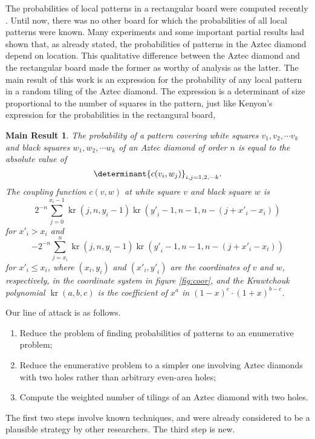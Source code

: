 \documentclass[10pt,reqno]{amsart}
\theoremstyle{plain}
\newtheorem{Mres}{Main Result}
\theoremstyle{definition}
\theoremstyle{remark}
\DeclareMathOperator{\kr }{kr}
\begin{document}
The probabilities of local patterns in a rectangular board were computed
recently \cite{Ken}. Until now, there was no other board for which
the probabilities of all local patterns were known. Many experiments 
and some important partial results \cite{CEP} had shown that, as already
stated, the probabilities of patterns in the Aztec diamond depend on location.
This qualitative difference between the Aztec diamond and the rectangular
board made the former as worthy of analysis as the latter. 
The main result of this work
is an expression for the 
probability of any local pattern in a random tiling of the Aztec diamond.
The expression is a determinant of size proportional to the number of
squares in the pattern, just like Kenyon's expression \cite{Ken} for
the probabilities in the rectangural board,
 
\begin{Mres}
The probability of a pattern covering white squares $v_1,v_2,\dotsb v_k$
and black squares $w_1,w_2,\dotsb w_k$ of
 an Aztec diamond of order $n$ is equal
to the absolute value of
\[\determinant{c(v_i,w_j)}_{i,j=1,2,\dotsb k}.\]
The {\em coupling function} $c(v,w)$ at white square $v$ and black
square $w$ is 
\[2^{-n} \sum_{j=0}^{x_i-1} \kr(j,n,y_i-1) 
			    \kr({y\prime }_i - 1,n-1,n-(j+{x\prime }_i-x_i))
\]
for ${x\prime }_i > x_i$ and
\[-2^{-n} \sum_{j=x_i}^n \kr(j,n,y_i-1) 
			 \kr({y\prime }_i-1,n-1,n-(j+{x\prime }_i-x_i))
\]
for ${x\prime }_i \leq x_i$, where $(x_i,y_i)$ and $({x\prime}_i,{y\prime}_i)$
are the coordinates of $v$ and $w$, respectively, in the coordinate
system in figure \ref{fig:coor}, and the {\em Krawtchouk polynomial}
$\kr(a,b,c)$ is the coefficient of $x^a$ in $(1-x)^c\cdot (1+x)^{b-c}$.
\end{Mres}

Our line of attack is as follows.
\begin{enumerate}
\item Reduce the problem of finding probabilities of patterns to an 
enumerative problem;
\item Reduce the enumerative problem to a simpler one involving
Aztec diamonds with two holes rather than arbitrary even-area holes;
\item Compute the weighted number of tilings of an Aztec diamond with two holes.
\end{enumerate}

The first two steps involve known techniques, and were already considered
to be a plausible strategy by other researchers. The third step is new.
\end{document}
